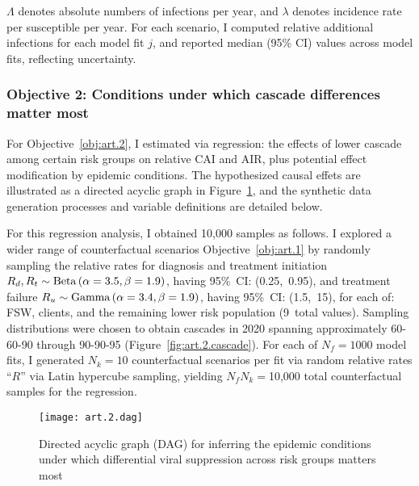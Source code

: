 $\Lambda$ denotes absolute numbers of infections per year, and
$\lambda$ denotes incidence rate per susceptible per year.
For each scenario, I computed relative additional infections for each model fit $j$,
and reported median (95\% CI) values across model fits, reflecting uncertainty.
\subsubsection{Objective 2: Conditions under which cascade differences matter most}\label{art.meth.obj.2}
For Objective~\ref{obj:art.2}, I estimated via regression:
the effects of lower cascade among certain risk groups on relative CAI and AIR,
plus potential effect modification by epidemic conditions.
The hypothesized causal effets are illustrated
as a directed acyclic graph in Figure~\ref{fig:art.2.dag},
and the synthetic data generation processes and variable definitions are detailed below.
\par
For this regression analysis, I obtained 10,000 samples as follows.
I explored a wider range of counterfactual scenarios \vs Objective~\ref{obj:art.1}
by randomly sampling the relative rates for diagnosis and treatment initiation
$R_d, R_t \sim \operatorname{Beta}\,(\alpha=3.5,\beta=1.9)$, having 95\%~CI: (0.25,~0.95),
and treatment failure
$R_u \sim \operatorname{Gamma}\,(\alpha=3.4,\beta=1.9)$, having 95\%~CI: (1.5,~15), for each of:
FSW, clients, and the remaining lower risk population (9~total values).
Sampling distributions were chosen to obtain cascades in 2020 spanning
approximately \mbox{60-60-90} through \mbox{90-90-95} (Figure~\ref{fig:art.2.cascade}). %
For each of $N_f = 1000$ model fits, I generated $N_k = 10$ counterfactual scenarios per fit
via random relative rates ``$R$'' via Latin hypercube sampling,
yielding $N_f N_k = {}$10,000 total counterfactual samples for the regression.
\begin{figure}
  \centering\texttt{[image: art.2.dag]}
  \caption{Directed acyclic graph (DAG) for inferring
    the epidemic conditions under which
    differential viral suppression across risk groups matters most}
  \label{fig:art.2.dag}
\end{figure}
